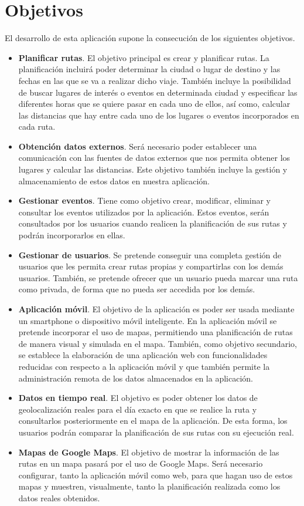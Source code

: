 \section{Objetivos}
El desarrollo de esta aplicación supone la consecución de los siguientes objetivos.

\begin{itemize}

	\item \textbf{Planificar rutas}. El objetivo principal es crear y planificar rutas. La planificación incluirá poder determinar la ciudad o lugar de destino y las fechas en las que se va a realizar dicho viaje. También incluye la posibilidad de buscar lugares de interés o eventos en determinada ciudad y especificar las diferentes horas que se quiere pasar en cada uno de ellos, así como, calcular las distancias que hay entre cada uno de los lugares o eventos incorporados en cada ruta.
	\item \textbf{Obtención datos externos}. Será necesario poder establecer una comunicación con las fuentes de datos externos que nos permita obtener los lugares y calcular las distancias. Este objetivo también incluye la gestión y almacenamiento de estos datos en nuestra aplicación.
	\item \textbf{Gestionar eventos}. Tiene como objetivo crear, modificar, eliminar y consultar los eventos utilizados por la aplicación. Estos eventos, serán consultados por los usuarios cuando realicen la planificación de sus rutas y podrán incorporarlos en ellas.
	\item \textbf{Gestionar de usuarios}. Se pretende conseguir una completa gestión de usuarios que les permita crear rutas propias y compartirlas con los demás usuarios. También, se pretende ofrecer que un usuario pueda marcar una ruta como privada, de forma que no pueda ser accedida por los demás.
	\item \textbf{Aplicación móvil}. El objetivo de la aplicación es poder ser usada mediante un smartphone o dispositivo móvil inteligente. En la aplicación móvil se pretende incorporar el uso de mapas, permitiendo una planificación de rutas de manera visual y simulada en el mapa. También, como objetivo secundario, se establece la elaboración de una aplicación web con funcionalidades reducidas con respecto a la aplicación móvil y que también permite la administración remota de los datos almacenados en la aplicación.
	\item \textbf{Datos en tiempo real}. El objetivo es poder obtener los datos de geolocalización reales para el día exacto en que se realice la ruta y consultarlos posteriormente en el mapa de la aplicación. De esta forma, los usuarios podrán comparar la planificación de sus rutas con su ejecución real.
	\item \textbf{Mapas de Google Maps}. El objetivo de mostrar la información de las rutas en un mapa pasará por el uso de Google Maps. Será necesario configurar, tanto la aplicación móvil como web, para que hagan uso de estos mapas y muestren, visualmente, tanto la planificación realizada como los datos reales obtenidos.
	
\end{itemize}


